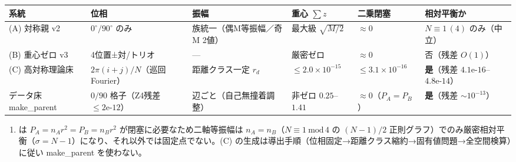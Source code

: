 \documentclass[
  a4paper,
]{ltjsarticle}
\newcounter{none} %
\providecommand{\tightlist}{%
  \setlength{\itemsep}{0pt}\setlength{\parskip}{0pt}}
\begin{document}
{\def\LTcaptype{none} %
\begin{longtable}[]{@{}
  >{\raggedright\arraybackslash}p{}
  >{\raggedright\arraybackslash}p{}
  >{\raggedright\arraybackslash}p{}
  >{\raggedright\arraybackslash}p{}
  >{\raggedright\arraybackslash}p{}
  >{\raggedright\arraybackslash}p{}@{}}
\toprule\noalign{}
\begin{minipage}[b]{\linewidth}\raggedright
系統
\end{minipage} & \begin{minipage}[b]{\linewidth}\raggedright
位相
\end{minipage} & \begin{minipage}[b]{\linewidth}\raggedright
振幅
\end{minipage} & \begin{minipage}[b]{\linewidth}\raggedright
重心 \(\sum z\)
\end{minipage} & \begin{minipage}[b]{\linewidth}\raggedright
二乗閉塞
\end{minipage} & \begin{minipage}[b]{\linewidth}\raggedright
相対平衡か
\end{minipage} \\
\midrule\noalign{}
\endhead
\bottomrule\noalign{}
\endlastfoot
(A) 対称親 v2 & \(0^\circ/90^\circ\) のみ & 族統一（偶M等振幅／奇M 2値）
& 最大級 \(\sqrt{M/2}\) & \(\approx0\) & \(N\equiv1\,(4)\)
のみ（中立） \\
(B) 重心ゼロ v3 & 4位置±対/トリオ & --- & 厳密ゼロ & \(\approx0\) &
否（残差 \(O(1)\)） \\
(C) 高対称理論床 & \(2\pi(i+j)/N\)（巡回Fourier） & 距離クラス一定
\(r_d\) & \(\le2.0\times10^{-15}\) & \(\le3.1\times10^{-16}\) &
\textbf{是}（残差 \(4.1\text{e-}16\)--\(4.8\text{e-}14\)） \\
データ床 make\_parent & \(0/90\) 格子（Z4残差 \(\le2\text{e-}12\)） &
辺ごと（自己無撞着調整） & 非ゼロ \(0.25\)--\(1.41\) &
\(\approx0\)（\(P_A=P_B\)） & \textbf{是}（残差 \(\sim10^{-13}\)） \\
\end{longtable}
}

\begin{enumerate}
\def\labelenumi{(\Alph{enumi})}
\tightlist
\item
  は \(P_A=n_A r^2=P_B=n_B r^2\) が閉塞に必要なため二軸等振幅は
  \(n_A=n_B\)（\(N\equiv1\ \mathrm{mod}\,4\) の \((N-1)/2\)
  正則グラフ）でのみ厳密相対平衡（\(\sigma=N-1\)）になり、それ以外では固定点でない。(C)
  の生成は導出手順（位相固定→距離クラス縮約→固有値問題→全空間検算）に従い
  make\_parent を使わない。
\end{enumerate}
\end{document}
